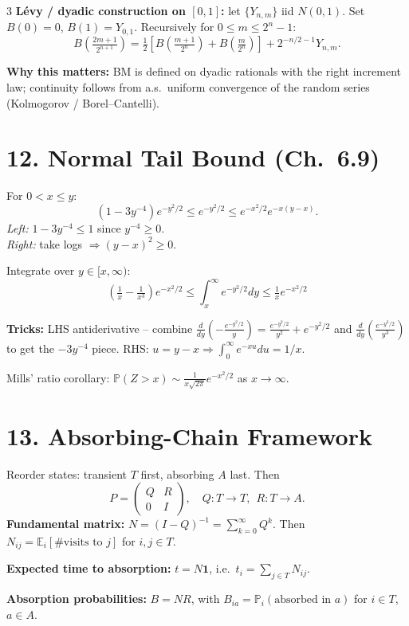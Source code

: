 \documentclass[8pt]{extarticle}
\newcommand{\E}{\mathbb{E}}
\newcommand{\PR}{\mathbb{P}}
\renewcommand{\b}[1]{\mathbf{#1}}
\begin{document}
\begin{multicols*}{3}
		\textbf{L\'evy / dyadic construction on $[0,1]$:} let $\{Y_{n,m}\}$ iid $N(0,1)$. Set $B(0)=0$, $B(1)=Y_{0,1}$. Recursively for $0\le m\le 2^n-1$:
		\[B\!\left(\tfrac{2m+1}{2^{n+1}}\right)=\tfrac12\!\left[B\!\left(\tfrac{m+1}{2^n}\right)+B\!\left(\tfrac{m}{2^n}\right)\right]+2^{-n/2-1}Y_{n,m}.\]
		
		\textbf{Why this matters:} BM is defined on dyadic rationals with the right increment law; continuity follows from a.s.\ uniform convergence of the random series (Kolmogorov / Borel--Cantelli).
		
		\section*{12. Normal Tail Bound (Ch.~6.9)}
		
		For $0<x\le y$:
		\[(1-3y^{-4})e^{-y^2/2}\le e^{-y^2/2}\le e^{-x^2/2}e^{-x(y-x)}.\]
		\emph{Left:} $1-3y^{-4}\le 1$ since $y^{-4}\ge 0$.\\
		\emph{Right:} take logs $\Rightarrow(y-x)^2\ge 0$.
		
		Integrate over $y\in[x,\infty)$:
		\[\boxed{\,\left(\tfrac{1}{x}-\tfrac{1}{x^3}\right)e^{-x^2/2}\le\int_x^\infty\!e^{-y^2/2}dy\le\tfrac{1}{x}e^{-x^2/2}\,}\]
		
		\textbf{Tricks:} LHS antiderivative -- combine $\frac{d}{dy}\!\left(-\frac{e^{-y^2/2}}{y}\right)=\frac{e^{-y^2/2}}{y^2}+e^{-y^2/2}$ and $\frac{d}{dy}\!\left(\frac{e^{-y^2/2}}{y^3}\right)$ to get the $-3y^{-4}$ piece. RHS: $u=y-x\Rightarrow\int_0^\infty e^{-xu}du=1/x$.
		
		Mills' ratio corollary: $\PR(Z>x)\sim\frac{1}{x\sqrt{2\pi}}e^{-x^2/2}$ as $x\to\infty$.
		
		\section*{13. Absorbing-Chain Framework}
		
		Reorder states: transient $T$ first, absorbing $A$ last. Then
		\[P=\begin{pmatrix}Q & R\\ 0 & I\end{pmatrix},\quad Q\!:T\to T,\ \ R\!:T\to A.\]
		\textbf{Fundamental matrix:} $N=(I-Q)^{-1}=\sum_{k=0}^\infty Q^k$. Then $N_{ij}=\E_i[\#\text{visits to }j]$ for $i,j\in T$.
		
		\textbf{Expected time to absorption:} $t=N\b 1$, i.e.\ $t_i=\sum_{j\in T}N_{ij}$.
		
		\textbf{Absorption probabilities:} $B=NR$, with $B_{ia}=\PR_i(\text{absorbed in }a)$ for $i\in T$, $a\in A$.
		

\end{multicols*}
\end{document}
